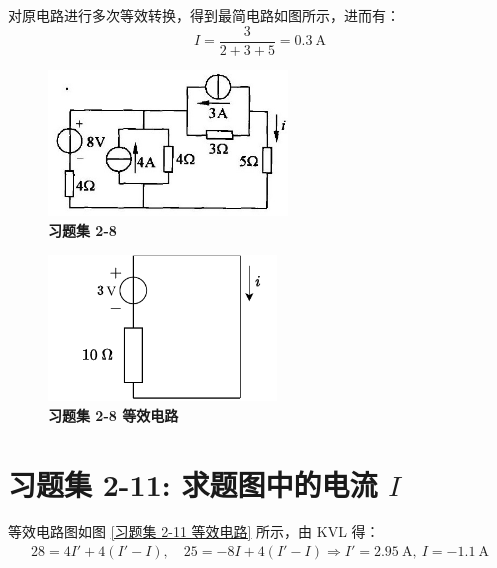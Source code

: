 \documentclass[UTF8]{report}
\theoremstyle{MyLineTheoremStyle} %
\theoremstyle{MyBlockTheoremStyle} %
\theoremstyle{MySubsubsectionStyle} %
\begin{document}
对原电路进行多次等效转换，得到最简电路如图所示，进而有：
\begin{equation*}
I = \frac{3}{2+3+5} = 0.3\ \mathrm{A}
\end{equation*}

\noindent\begin{minipage}{0.49\textwidth}
    \begin{figure}[H]\centering
        \includegraphics[height=110pt]{assets/2/78abd22edee32bbd38134d510246a9ab.jpg}
        \caption{\textbf{习题集 2-8}}
    \end{figure}
\end{minipage}\hfill
\begin{minipage}{0.49\textwidth}
\begin{figure}[H]\centering
\includegraphics[height=110pt]{assets/2/2-8.drawio.pdf}
\caption{\textbf{习题集 2-8 等效电路}}\label{习题集 2-8 等效电路}
\end{figure}
\end{minipage}

\section{习题集 2-11: 求题图中的电流 $I$}

等效电路图如图 \ref{习题集 2-11 等效电路} 所示，由 KVL 得：
\begin{gather*}
28 = 4I' + 4(I' - I),\quad 25 = -8I + 4(I' - I) \Longrightarrow I' = 2.95\ \mathrm{A},\ I = -1.1\ \mathrm{A}
\end{gather*}
\end{document}
